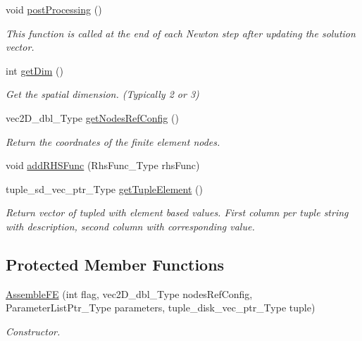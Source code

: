 \begin{DoxyCompactItemize}
void \hyperlink{classFEDD_1_1AssembleFE_a8ae32f71020082d81b055afbeda6fc29}{post\+Processing} ()
\begin{DoxyCompactList}\small\item\em This function is called at the end of each Newton step after updating the solution vector. \end{DoxyCompactList}\item 
int \hyperlink{classFEDD_1_1AssembleFE_a35ada89164c74b433340733c01f30f4b}{get\+Dim} ()
\begin{DoxyCompactList}\small\item\em Get the spatial dimension. (Typically 2 or 3) \end{DoxyCompactList}\item 
vec2\+D\+\_\+dbl\+\_\+\+Type \hyperlink{classFEDD_1_1AssembleFE_a93f37b5e5f8f9a73152abb2e8be4ba4f}{get\+Nodes\+Ref\+Config} ()
\begin{DoxyCompactList}\small\item\em Return the coordnates of the finite element nodes. \end{DoxyCompactList}\item 
void \hyperlink{classFEDD_1_1AssembleFE_a9eea5124c4b385c2807ad8b20614d050}{add\+R\+H\+S\+Func} (Rhs\+Func\+\_\+\+Type rhs\+Func)
\item 
tuple\+\_\+sd\+\_\+vec\+\_\+ptr\+\_\+\+Type \hyperlink{classFEDD_1_1AssembleFE_a4d5d128fbd72747e01af917b16cee6f6}{get\+Tuple\+Element} ()
\begin{DoxyCompactList}\small\item\em Return vector of tupled with element based values. First column per tuple string with description, second column with corresponding value. \end{DoxyCompactList}\end{DoxyCompactItemize}
\subsection*{Protected Member Functions}
\begin{DoxyCompactItemize}
\item 
\hyperlink{classFEDD_1_1AssembleFE_a5ff56b610942ec92cc1b1e0ac1e07ce4}{Assemble\+FE} (int flag, vec2\+D\+\_\+dbl\+\_\+\+Type nodes\+Ref\+Config, Parameter\+List\+Ptr\+\_\+\+Type parameters, tuple\+\_\+disk\+\_\+vec\+\_\+ptr\+\_\+\+Type tuple)
\begin{DoxyCompactList}\small\item\em Constructor. \end{DoxyCompactList}\end{DoxyCompactItemize}
